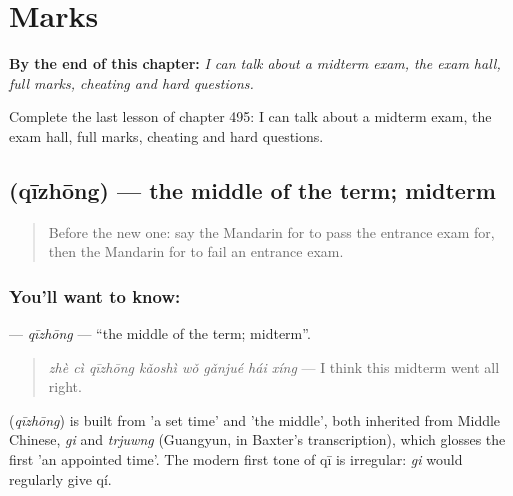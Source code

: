 
\chapter{Marks}
\label{ch:zh-marks}

\begin{chapteropening}
\textbf{By the end of this chapter:} \emph{I can talk about a midterm exam, the exam hall, full marks, cheating and hard questions.}

Complete the last lesson of chapter 495: I can talk about a midterm exam, the exam hall, full marks, cheating and hard questions.
\end{chapteropening}

\section[\texorpdfstring{\zh{期中} (qīzhōng)}{期中 (qīzhōng)}]{ (qīzhōng) — the middle of the term; midterm}

\label{lesson:ZH-C495-qizhong}



\begin{quote}
Before the new one: say the Mandarin for to pass the entrance exam for, then the Mandarin for to fail an entrance exam.
\end{quote}

\subsection*{You'll want to know: }
\textbf{} — \emph{qīzhōng} — \textquotedblleft{}the middle of the term; midterm\textquotedblright{}.

\begin{quote}
\emph{zhè cì qīzhōng kǎoshì wǒ gǎnjué hái xíng} — I think this midterm went all right.
\end{quote}

\begin{cousinweb}
\textbf{} (\emph{qīzhōng}) is built from  'a set time' and  'the middle', both inherited from Middle Chinese, \emph{gi} and \emph{trjuwng} (Guangyun, in Baxter's transcription), which glosses the first 'an appointed time'. The modern first tone of qī is irregular: \emph{gi} would regularly give qí.
\end{cousinweb}

